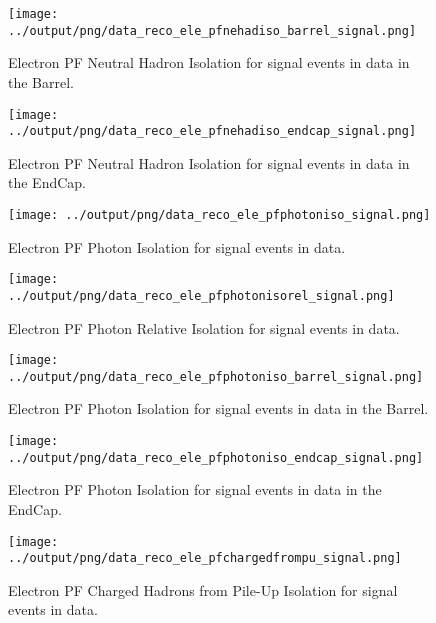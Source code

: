 \documentclass[11pt]{book}
\begin{document}
\begin{figure}[htb]
\centering
\texttt{[image: ../output/png/data\_reco\_ele\_pfnehadiso\_barrel\_signal.png]}
\caption{Electron PF Neutral Hadron Isolation for signal events in data in the Barrel.}
\label{fig:data_ele_pfnehadiso_barrel_signal}
\end{figure}

\begin{figure}[htb]
\centering
\texttt{[image: ../output/png/data\_reco\_ele\_pfnehadiso\_endcap\_signal.png]}
\caption{Electron PF Neutral Hadron Isolation for signal events in data in the EndCap.}
\label{fig:data_ele_pfnehadiso_endcap_signal}
\end{figure}

\begin{figure}[htb]
\centering
\texttt{[image: ../output/png/data\_reco\_ele\_pfphotoniso\_signal.png]}
\caption{Electron PF Photon Isolation for signal events in data.}
\label{fig:data_ele_pfphotoniso_signal}
\end{figure}

\begin{figure}[htb]
\centering
\texttt{[image: ../output/png/data\_reco\_ele\_pfphotonisorel\_signal.png]}
\caption{Electron PF Photon Relative Isolation for signal events in data.}
\label{fig:data_ele_pfphotonisorel_signal}
\end{figure}

\begin{figure}[htb]
\centering
\texttt{[image: ../output/png/data\_reco\_ele\_pfphotoniso\_barrel\_signal.png]}
\caption{Electron PF Photon Isolation for signal events in data in the Barrel.}
\label{fig:data_ele_pfphotoniso_barrel_signal}
\end{figure}

\begin{figure}[htb]
\centering
\texttt{[image: ../output/png/data\_reco\_ele\_pfphotoniso\_endcap\_signal.png]}
\caption{Electron PF Photon Isolation for signal events in data in the EndCap.}
\label{fig:data_ele_pfphotoniso_endcap_signal}
\end{figure}

\begin{figure}[htb]
\centering
\texttt{[image: ../output/png/data\_reco\_ele\_pfchargedfrompu\_signal.png]}
\caption{Electron PF Charged Hadrons from Pile-Up Isolation for signal events in data.}
\label{fig:data_ele_pfchargedfrompu_signal}
\end{figure}
\end{document}
